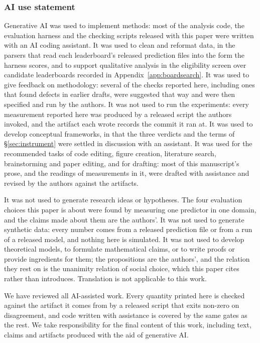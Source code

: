 \documentclass{article}
\begin{document}
\subsubsection*{AI use statement}

Generative AI was used to implement methods: most of the analysis code, the evaluation harness and
the checking scripts released with this paper were written with an AI coding assistant. It was used
to clean and reformat data, in the parsers that read each leaderboard's released prediction files
into the form the harness scores, and to support qualitative analysis in the eligibility screen over
candidate leaderboards recorded in Appendix~\ref{app:boardsearch}. It was used to give feedback on
methodology: several of the checks reported here, including ones that found defects in earlier
drafts, were suggested that way and were then specified and run by the authors. It was not used to
run the experiments: every measurement reported here was produced by a released script the authors
invoked, and the artifact each wrote records the commit it ran at. It was used to
develop conceptual frameworks, in that the three verdicts and the terms of \S\ref{sec:instrument}
were settled in discussion with an assistant. It was used for the recommended tasks of code editing,
figure creation, literature search, brainstorming and paper editing, and for drafting: most of this
manuscript's prose, and the readings of measurements in it, were drafted with assistance and revised
by the authors against the artifacts.

It was not used to generate research ideas or hypotheses. The four evaluation choices this paper is
about were found by measuring one predictor in one domain, and the claims made about them are the
authors'. It was not used to generate synthetic data: every number comes from a released prediction
file or from a run of a released model, and nothing here is simulated. It was not used to develop
theoretical models, to formulate mathematical claims, or to write proofs or provide ingredients for
them; the propositions are the authors', and the relation they rest on is the unanimity relation of
social choice, which this paper cites rather than introduces. Translation is not applicable to this
work.

We have reviewed all AI-assisted work. Every quantity printed here is checked against the artifact
it comes from by a released script that exits non-zero on disagreement, and code written with
assistance is covered by the same gates as the rest. We take responsibility for the final content of
this work, including text, claims and artifacts produced with the aid of generative AI.
\end{document}
